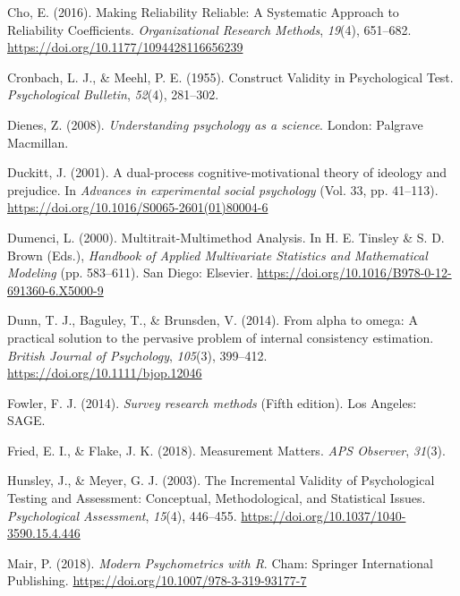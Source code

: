 \documentclass[
  english,
  man]{apa6}
\begin{document}
\leavevmode\hypertarget{ref-choMakingReliabilityReliable2016}{}%
Cho, E. (2016). Making Reliability Reliable: A Systematic Approach to Reliability Coefficients. \emph{Organizational Research Methods}, \emph{19}(4), 651--682. \url{https://doi.org/10.1177/1094428116656239}

\leavevmode\hypertarget{ref-cronbachConstructValidityPsychological1955}{}%
Cronbach, L. J., \& Meehl, P. E. (1955). Construct Validity in Psychological Test. \emph{Psychological Bulletin}, \emph{52}(4), 281--302.

\leavevmode\hypertarget{ref-dienesUnderstandingPsychologyScience2008}{}%
Dienes, Z. (2008). \emph{Understanding psychology as a science}. London: Palgrave Macmillan.

\leavevmode\hypertarget{ref-Duckitt2001}{}%
Duckitt, J. (2001). A dual-process cognitive-motivational theory of ideology and prejudice. In \emph{Advances in experimental social psychology} (Vol. 33, pp. 41--113). \url{https://doi.org/10.1016/S0065-2601(01)80004-6}

\leavevmode\hypertarget{ref-dumenciMultitraitMultimethodAnalysis2000}{}%
Dumenci, L. (2000). Multitrait-Multimethod Analysis. In H. E. Tinsley \& S. D. Brown (Eds.), \emph{Handbook of Applied Multivariate Statistics and Mathematical Modeling} (pp. 583--611). San Diego: Elsevier. \url{https://doi.org/10.1016/B978-0-12-691360-6.X5000-9}

\leavevmode\hypertarget{ref-dunnAlphaOmegaPractical2014}{}%
Dunn, T. J., Baguley, T., \& Brunsden, V. (2014). From alpha to omega: A practical solution to the pervasive problem of internal consistency estimation. \emph{British Journal of Psychology}, \emph{105}(3), 399--412. \url{https://doi.org/10.1111/bjop.12046}

\leavevmode\hypertarget{ref-fowlerSurveyResearchMethods2014}{}%
Fowler, F. J. (2014). \emph{Survey research methods} (Fifth edition). Los Angeles: SAGE.

\leavevmode\hypertarget{ref-friedMeasurementMatters2018}{}%
Fried, E. I., \& Flake, J. K. (2018). Measurement Matters. \emph{APS Observer}, \emph{31}(3).

\leavevmode\hypertarget{ref-hunsleyIncrementalValidityPsychological2003}{}%
Hunsley, J., \& Meyer, G. J. (2003). The Incremental Validity of Psychological Testing and Assessment: Conceptual, Methodological, and Statistical Issues. \emph{Psychological Assessment}, \emph{15}(4), 446--455. \url{https://doi.org/10.1037/1040-3590.15.4.446}

\leavevmode\hypertarget{ref-mairModernPsychometrics2018}{}%
Mair, P. (2018). \emph{Modern Psychometrics with R}. Cham: Springer International Publishing. \url{https://doi.org/10.1007/978-3-319-93177-7}
\end{document}
